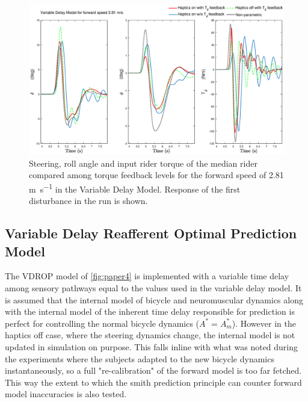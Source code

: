 \begin{figure}[!h]
    \centering
    \captionsetup{justification=centering,margin=2cm}

    \includegraphics[width=\textwidth]{images/fb_compare_plots/delay_fb_compare28.eps}
    \caption{Steering, roll angle and input rider torque of the median rider compared among torque feedback levels  for the forward speed of 2.81 \si{\meter\per\second} in the Variable Delay Model. Response of the first disturbance in the run is shown.}
    \label{fig:paper8}
\end{figure}


\subsection{Variable Delay Reafferent Optimal Prediction  Model}

The VDROP model of  \cref{fig:paper4} is implemented with a variable  time delay among sensory pathways equal to the values used in the variable delay model. It is assumed that the internal model of bicycle and neuromuscular dynamics along with the internal model of the inherent time delay responsible for prediction is perfect for controlling the normal bicycle dynamics (\ensuremath{A^*=A_m^*}). However in the haptics off case, where the steering dynamics change, the internal model is not updated in simulation on purpose. This falls inline with what was noted during the experiments where the subjects adapted to the new bicycle dynamics instantaneously, so a full "re-calibration" of the forward model is too far fetched. This way the extent to which the smith prediction principle can counter forward model inaccuracies is also tested. 


